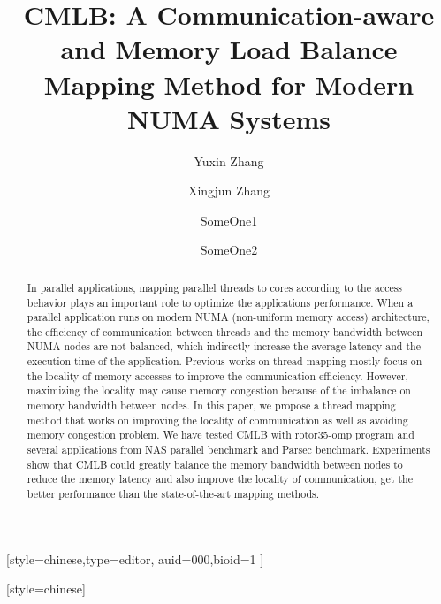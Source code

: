 \documentclass[a4paper,fleqn]{cas-sc}
\begin{document}
\let\WriteBookmarks\relax
\def\floatpagepagefraction{1}
\def\textpagefraction{.001}

\title [mode = title]{CMLB: A Communication-aware and Memory Load Balance Mapping Method for Modern NUMA Systems}                      
\tnotemark[1]



\author{Yuxin Zhang}[style=chinese,type=editor,
                        auid=000,bioid=1 ]
                        


\address{School of Computer Science and Technology, Xi'an Jiaotong University, Xi'an 710049, China}


\author{Xingjun Zhang}[style=chinese]
\cormark[1] %

\author{SomeOne1}


\author{SomeOne2}




\begin{abstract}
In parallel applications, mapping parallel threads to cores according to the access behavior plays an important role to optimize the applications performance. When a parallel application runs on modern NUMA (non-uniform memory access) architecture, the efficiency of communication between threads and the memory bandwidth between NUMA nodes are not balanced, which indirectly increase the average latency and the execution time of the application. Previous works on thread mapping mostly focus on the locality of memory accesses to improve the communication efficiency. However, maximizing the locality may cause memory congestion because of the imbalance on memory bandwidth between nodes. In this paper, we propose a thread mapping method that works on improving the locality of communication as well as avoiding memory congestion problem. We have tested CMLB with rotor35-omp program and several applications from NAS parallel benchmark and Parsec benchmark. Experiments show that CMLB could greatly balance the memory bandwidth between nodes to reduce the memory latency and also improve the locality of communication, get the better performance than the state-of-the-art mapping methods. 
\end{abstract}
\end{document}
